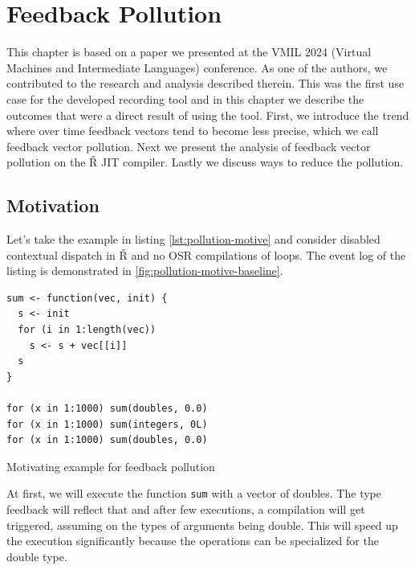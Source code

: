 \chapter{Feedback Pollution}

\begin{chapterabstract}
  This chapter is based on a paper we presented at the VMIL 2024 (Virtual Machines and Intermediate Languages) conference\cite{feedback-vmil}. As one of the authors, we contributed to the research and analysis described therein. This was the first use case for the developed recording tool and in this chapter we describe the outcomes that were a direct result of using the tool. First, we introduce the trend where over time feedback vectors tend to become less precise, which we call feedback vector pollution. Next we present the analysis of feedback vector pollution on the Ř JIT compiler. Lastly we discuss ways to reduce the pollution.
\end{chapterabstract}


\section{Motivation}

Let's take the example in listing \ref{lst:pollution-motive} and consider disabled contextual dispatch in Ř and no OSR compilations of loops. The event log of the listing is demonstrated in \ref{fig:pollution-motive-baseline}.

\begin{listing}[H]
	\begin{verbatim}
sum <- function(vec, init) {
  s <- init
  for (i in 1:length(vec))
    s <- s + vec[[i]]
  s
}

for (x in 1:1000) sum(doubles, 0.0)
for (x in 1:1000) sum(integers, 0L)
for (x in 1:1000) sum(doubles, 0.0)
  \end{verbatim}
	\caption{Motivating example for feedback pollution}\label{lst:pollution-motive}
\end{listing}

At first, we will execute the function \texttt{sum} with a vector of doubles. The type feedback will reflect that and after few executions, a compilation will get triggered, assuming on the types of arguments being double. This will speed up the execution significantly because the operations can be specialized for the double type.

